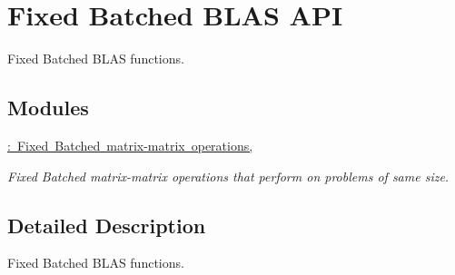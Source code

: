 \hypertarget{group__fixed__api}{}\section{Fixed Batched B\+L\+AS A\+PI}
\label{group__fixed__api}


Fixed Batched B\+L\+AS functions.  


\subsection*{Modules}
\begin{DoxyCompactItemize}
\item 
\mbox{\hyperlink{group__core__batched__blas}{\+: Fixed Batched matrix-\/matrix operations,}}
\begin{DoxyCompactList}\small\item\em Fixed Batched matrix-\/matrix operations that perform on problems of same size. \end{DoxyCompactList}\end{DoxyCompactItemize}


\subsection{Detailed Description}
Fixed Batched B\+L\+AS functions. 



